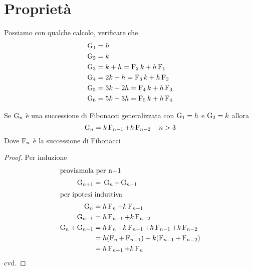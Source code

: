 \section{Proprietà}
Possiamo con qualche calcolo, verificare che
\begin{align*}
\Gib{1}={}&h\\
\Gib{2}={}&k\\
\Gib{3}={}&k+h=\Fib{2}k+h\Fib{1}\\
\Gib{4}={}&2k+h=\Fib{3}k+h\Fib{2}\\
\Gib{5}={}&3k+2h=\Fib{4}k+h\Fib{3}\\
\Gib{6}={}&5k+3h=\Fib{5}k+h\Fib{4}
\end{align*} 
\begin{thm}[Derivazione]
	Se $\Gib{n}$ è una successione di Fibonacci generalizzata  con $\Gib{1}=h$ e $\Gib{2}=k $ allora
	\begin{equation}
		\Gib{n}=k\Fib{n-1}+h\Fib{n-2}\quad n>3
	\end{equation}\label{thm:FibGenDer}
	Dove $\Fib{n}$ è la successione di Fibonacci
\end{thm}
\begin{proof}
Per induzione
\begin{align*}
\intertext{proviamola per n+1}
		\Gib{n+1}={}&\Gib{n}+\Gib{n-1}\\
\intertext{per ipotesi induttiva}
\Gib{n}={}&h\Fib{n}+k\Fib{n-1}\\
\Gib{n-1}={}&h\Fib{n-1}+k\Fib{n-2}\\
\Gib{n}+\Gib{n-1}={}&h\Fib{n}+k\Fib{n-1}+h\Fib{n-1}+k\Fib{n-2}\\
={}&h(\Fib{n}+\Fib{n-1})+k(\Fib{n-1}+\Fib{n-2})\\
={}&h\Fib{n+1}+k\Fib{n}\\
\end{align*}
cvd.
\end{proof}